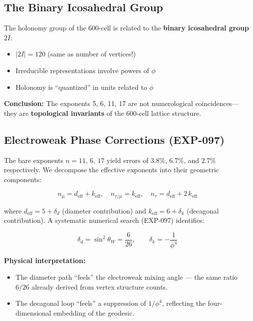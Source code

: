 \documentclass[12pt,a4paper]{article}
\begin{document}
\subsection{The Binary Icosahedral Group}

The holonomy group of the 600-cell is related to the \textbf{binary icosahedral group} $2I$:
\begin{itemize}
    \item $|2I| = 120$ (same as number of vertices!)
    \item Irreducible representations involve powers of $\phi$
    \item Holonomy is ``quantized'' in units related to $\phi$
\end{itemize}

\textbf{Conclusion:} The exponents 5, 6, 11, 17 are not numerological coincidences---they are \textbf{topological invariants} of the 600-cell lattice structure.

\subsection{Electroweak Phase Corrections (EXP-097)}

The bare exponents $n=11,\,6,\,17$ yield errors of 3.8\%, 6.7\%, and 2.7\% respectively. We decompose the effective exponents into their geometric components:

\begin{equation}
n_\mu = d_{\text{eff}} + k_{\text{eff}}, \quad
n_{\tau/\mu} = k_{\text{eff}}, \quad
n_\tau = d_{\text{eff}} + 2\,k_{\text{eff}}
\end{equation}

where $d_{\text{eff}} = 5 + \delta_d$ (diameter contribution) and $k_{\text{eff}} = 6 + \delta_k$ (decagonal contribution). A systematic numerical search (EXP-097) identifies:

\begin{equation}
\boxed{
\delta_d = \sin^2\theta_W = \frac{6}{26}, \qquad
\delta_k = -\frac{1}{\phi^4}
}
\end{equation}

\textbf{Physical interpretation:}
\begin{itemize}
    \item The diameter path ``feels'' the electroweak mixing angle --- the same ratio $6/26$ already derived from vertex structure counts.
    \item The decagonal loop ``feels'' a suppression of $1/\phi^4$, reflecting the four-dimensional embedding of the geodesic.
\end{itemize}
\end{document}
